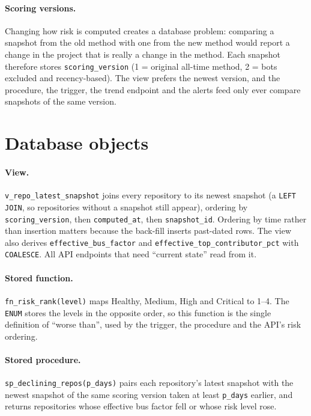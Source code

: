 \documentclass[11pt,a4paper]{report}
\begin{document}
\paragraph{Scoring versions.} Changing how risk is computed creates a database
problem: comparing a snapshot from the old method with one from the new method
would report a change in the project that is really a change in the method.
Each snapshot therefore stores \texttt{scoring\_version} (1 = original
all-time method, 2 = bots excluded and recency-based). The view prefers the
newest version, and the procedure, the trigger, the trend endpoint and the
alerts feed only ever compare snapshots of the same version.

\section{Database objects}

\paragraph{View.} \texttt{v\_repo\_latest\_snapshot} joins every repository to
its newest snapshot (a \texttt{LEFT JOIN}, so repositories without a snapshot
still appear), ordering by \texttt{scoring\_version}, then
\texttt{computed\_at}, then \texttt{snapshot\_id}. Ordering by time rather
than insertion matters because the back-fill inserts past-dated rows. The view
also derives \texttt{effective\_bus\_factor} and
\texttt{effective\_top\_contributor\_pct} with \texttt{COALESCE}. All API
endpoints that need ``current state'' read from it.

\paragraph{Stored function.} \texttt{fn\_risk\_rank(level)} maps Healthy,
Medium, High and Critical to 1--4. The \texttt{ENUM} stores the levels in the
opposite order, so this function is the single definition of ``worse than'',
used by the trigger, the procedure and the API's risk ordering.

\paragraph{Stored procedure.} \texttt{sp\_declining\_repos(p\_days)} pairs each
repository's latest snapshot with the newest snapshot of the same scoring
version taken at least \texttt{p\_days} earlier, and returns repositories whose
effective bus factor fell or whose risk level rose.
\end{document}
